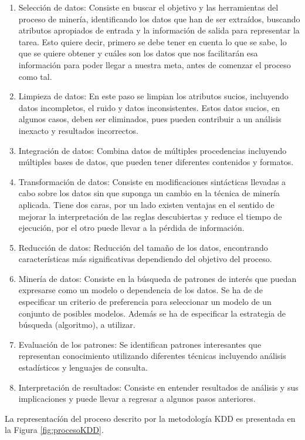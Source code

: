 \begin{enumerate}
\item Selección de datos: Consiste en buscar el objetivo y las herramientas del proceso de minería, identificando los datos que han de ser extraídos, buscando atributos apropiados de entrada y la información de salida para representar la tarea. Esto quiere decir, primero se debe tener en cuenta lo que se sabe, lo que se quiere obtener y cuáles son los datos que nos facilitarán esa información para poder llegar a nuestra meta, antes de comenzar el proceso como tal.
\item Limpieza de datos: En este paso se limpian los atributos sucios, incluyendo datos incompletos, el ruido y datos inconsistentes. Estos datos sucios, en algunos casos, deben ser eliminados, pues pueden contribuir a un análisis inexacto y resultados incorrectos.
\item Integración de datos: Combina datos de múltiples procedencias incluyendo múltiples bases de datos, que pueden tener diferentes contenidos y formatos.
\item Transformación de datos: Consiste en modificaciones sintácticas llevadas a cabo sobre los datos sin que suponga un cambio en la técnica de minería aplicada. Tiene dos caras, por un lado existen ventajas en el sentido de mejorar la interpretación de las reglas descubiertas y reduce el tiempo de ejecución, por el otro puede llevar a la pérdida de información.
\item Reducción de datos: Reducción del tamaño de los datos, encontrando características más significativas dependiendo del objetivo del proceso.
\item Minería de datos: Consiste en la búsqueda de patrones de interés que puedan expresarse como un modelo o dependencia de los datos. Se ha de de especificar un criterio de preferencia para seleccionar un modelo de un conjunto de posibles modelos. Además se ha de especificar la estrategia de búsqueda (algoritmo), a utilizar.
\item Evaluación de los patrones: Se identifican patrones interesantes que representan conocimiento utilizando diferentes técnicas incluyendo análisis estadísticos y lenguajes de consulta.
\item Interpretación de resultados: Consiste en entender resultados de análisis y sus implicaciones y puede llevar a regresar a algunos pasos anteriores.
\end{enumerate}

La representacíón del proceso descrito por la metodología KDD es presentada en la Figura \ref{fig:procesoKDD}.

